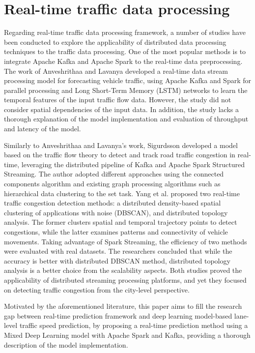 \documentclass[11pt]{uonthesis}
\begin{document}
\section{Real-time traffic data processing}

Regarding real-time traffic data processing framework, a number of studies have been conducted to explore the applicability of distributed data processing techniques to the traffic data processing. One of the most popular methods is to integrate Apache Kafka and Apache Spark to the real-time data preprocessing. The work of Anveshrithaa and Lavanya \cite{9077707} developed a real-time data stream processing model for forecasting vehicle traffic, using Apache Kafka and Spark for parallel processing and Long Short-Term Memory (LSTM) networks to learn the temporal features of the input traffic flow data. However, the study did not consider spatial dependencies of the input data. In addition, the study lacks a thorough explanation of the model implementation and evaluation of throughput and latency of the model.

Similarly to Anveshrithaa and Lavanya's work, Sigurdsson \cite{Sigurdsson2018RoadTC} developed a model based on the traffic flow theory to detect and track road traffic congestion in real-time, leveraging the distributed pipeline of Kafka and Apache Spark Structured Streaming. The author adopted different approaches using the connected components algorithm and existing graph processing algorithms such as hierarchical data clustering to the set task. Yang et al. \cite{Yang2019} proposed two real-time traffic congestion detection methods: a distributed density-based spatial clustering of applications with noise (DBSCAN), and distributed topology analysis. The former clusters spatial and temporal trajectory points to detect congestions, while the latter examines patterns and connectivity of vehicle movements. Taking advantage of Spark Streaming, the efficiency of two methods were evaluated with real datasets. The researchers concluded that while the accuracy is better with distributed DBSCAN method, distributed topology analysis is a better choice from the scalability aspects. Both studies proved the applicability of distributed streaming processing platforms, and yet they focused on detecting traffic congestion from the city-level perspective.

Motivated by the aforementioned literature, this paper aims to fill the research gap between real-time prediction framework and deep learning model-based lane-level traffic speed prediction, by proposing a real-time prediction method using a Mixed Deep Learning model with Apache Spark and Kafka, providing a thorough description of the model implementation. %
\end{document}

